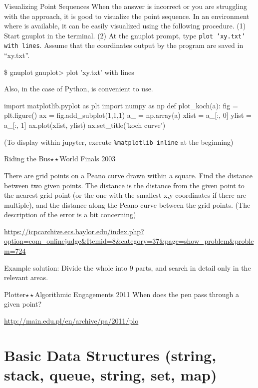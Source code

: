 \begin{tipsbox}{Visualizing Point Sequences}
  When the answer is incorrect or you are struggling with the approach, it is good to visualize the point sequence.
In an environment where  is available, it can be easily visualized using the following procedure.
(1) Start gnuplot in the terminal. (2) At the gnuplot prompt, type \texttt{plot 'xy.txt' with lines}. Assume that the coordinates output by the program are saved in ``xy.txt''.
\begin{terminal}
\$ gnuplot
gnuplot> plot 'xy.txt' with lines
\end{terminal}
\end{tipsbox}
Also, in the case of Python,  is convenient to use.
\begin{pybox}
import matplotlib.pyplot as plt
import numpy as np
def plot_koch(a):
    fig = plt.figure()
    ax = fig.add_subplot(1,1,1)
    a_ = np.array(a)
    xlist = a_[:, 0]
    ylist = a_[:, 1]
    ax.plot(xlist, ylist)
    ax.set_title('koch curve')
\end{pybox}
(To display within jupyter, execute \texttt{\%matplotlib inline} at the beginning)

\begin{pbox}{Riding the Bus$\star\star$}{World Finals 2003}

There are grid points on a Peano curve drawn within a square. Find the distance between two given points. The distance is the distance from the given point to the nearest grid point (or the one with the smallest x,y coordinates if there are multiple), and the distance along the Peano curve between the grid points. (The description of the error is a bit concerning)

\url{https://icpcarchive.ecs.baylor.edu/index.php?option=com_onlinejudge&Itemid=8&category=37&page=show_problem&problem=724}
\end{pbox}

Example solution: Divide the whole into 9 parts, and search in detail only in the relevant areas.

\begin{pbox}{Plotter$\star\star$}{Algorithmic Engagements 2011}
When does the pen pass through a given point?
  
\url{http://main.edu.pl/en/archive/pa/2011/plo}
\end{pbox}
\chapter{Basic Data Structures (string, stack, queue, string, set, map)}\label{chapter:datastructure}


